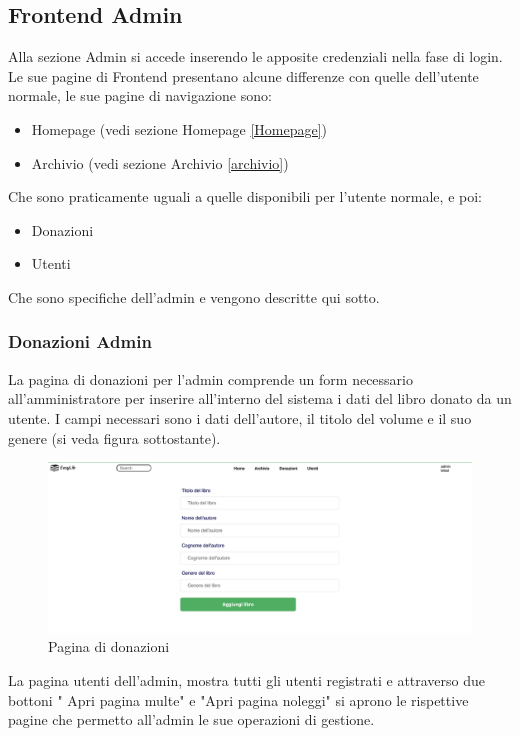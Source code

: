 \documentclass{article}
\begin{document}
\subsection{Frontend Admin}
Alla sezione Admin si accede inserendo le apposite credenziali nella fase di login.
Le sue pagine di Frontend presentano alcune differenze con quelle dell'utente normale, le sue pagine di navigazione sono:
\begin{itemize}
    \item Homepage (vedi sezione Homepage \ref{Homepage})
    \item Archivio (vedi sezione Archivio \ref{archivio})
\end{itemize}
Che sono praticamente uguali a quelle disponibili per l'utente normale, e poi:
\begin{itemize}
    \item Donazioni
    \item Utenti
\end{itemize}
Che sono specifiche dell'admin e vengono descritte qui sotto.

\subsubsection{Donazioni Admin}
La pagina di donazioni per l'admin comprende un form necessario all'amministratore per inserire all'interno del sistema i dati del libro donato da un utente.
I campi necessari sono i dati dell'autore, il titolo del volume e il suo genere (si veda figura sottostante).
\begin{figure}[H]
    \centering
    \includegraphics[width=130mm]{D4/Images/Donazioni.png}
    \caption{Pagina di donazioni}
    \label{fig:enter-label}
\end{figure}
La pagina utenti dell'admin, mostra tutti gli utenti registrati e attraverso due bottoni " Apri pagina multe" e "Apri pagina noleggi" si aprono le rispettive pagine che permetto all'admin le sue operazioni di gestione.
\end{document}
